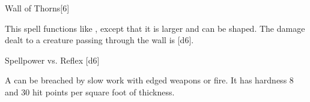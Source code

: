 \begin{spellsection}[Greater]{Wall of Thorns}[6]
    \begin{spellheader}
    \end{spellheader}
    \begin{spellcontent}
        \begin{spelltargetinginfo}
        \end{spelltargetinginfo}
        \begin{spelleffects}
            \spellspecial This spell functions like , except that it is larger and can be shaped. The damage dealt to a creature passing through the wall is [d6].
            \spelldur \durshort
        \end{spelleffects}
    \end{spellcontent}
    \begin{spellsubcontent}
        \begin{spelltargetinginfo}
        \end{spelltargetinginfo}
        \begin{spelleffects}
            \begin{spellattack}{Spellpower vs. Reflex}
                \spellsuccess {}[d6]
            \end{spellattack}
        \end{spelleffects}
    \end{spellsubcontent}
    \begin{spellfooter}
        \spellnotes A  can be breached by slow work with edged weapons or fire. It has hardness 8 and 30 hit points per square foot of thickness.

        \physicalspellnotes
        \miscastexplode
    \end{spellfooter}
\end{spellsection}

